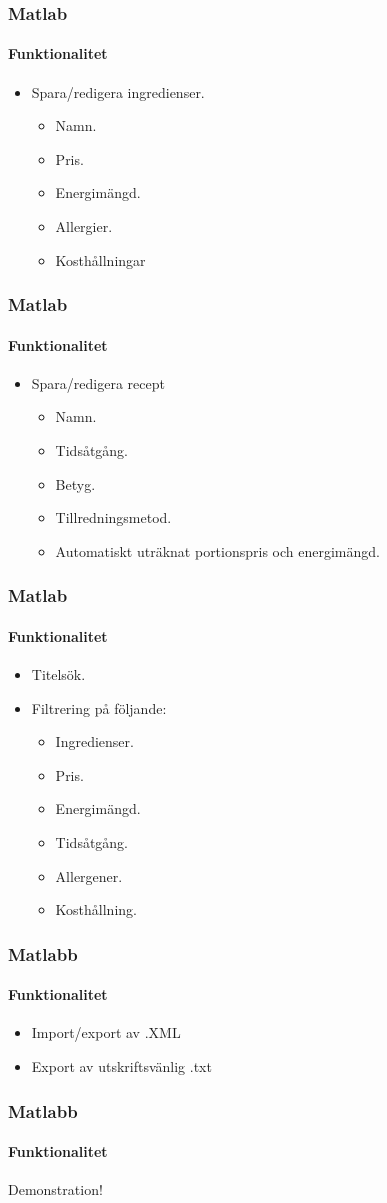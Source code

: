 \begin{frame}
  \frametitle{Matlab}
  \framesubtitle{Funktionalitet}
  \begin{itemize}
  \item<1-> Spara/redigera ingredienser.
    \begin{itemize}
    \item<1-> Namn.
    \item<1-> Pris.
    \item<1-> Energimängd.
    \item<1-> Allergier.
    \item<1-> Kosthållningar
    \end{itemize}  
  \end{itemize}
\end{frame}

\begin{frame}
  \frametitle{Matlab}
  \framesubtitle{Funktionalitet}
  \begin{itemize}
  \item<1-> Spara/redigera recept
    \begin{itemize}
    \item<1-> Namn.
    \item<1-> Tidsåtgång.
    \item<1-> Betyg.
    \item<1-> Tillredningsmetod.
    \item<1-> Automatiskt uträknat portionspris och energimängd.
    \end{itemize}
  \end{itemize}
\end{frame}

\begin{frame}
  \frametitle{Matlab}
  \framesubtitle{Funktionalitet}
  \begin{itemize}
  \item<1-> Titelsök.
  \item<2-> Filtrering på följande:
    \begin{itemize}
    \item<2-> Ingredienser.
    \item<2-> Pris.
    \item<2-> Energimängd.
    \item<2-> Tidsåtgång.
    \item<2-> Allergener.
    \item<2-> Kosthållning.
    \end{itemize}
  \end{itemize}
\end{frame}

\begin{frame}
  \frametitle{Matlabb}
  \framesubtitle{Funktionalitet}
  \begin{itemize}
  \item<1-> Import/export av .XML
  \item<2-> Export av utskriftsvänlig  .txt
  \end{itemize}
\end{frame}

\begin{frame}[c]
  \frametitle{Matlabb}
  \framesubtitle{Funktionalitet}
  \centering
  \Huge{Demonstration!}
\end{frame}

